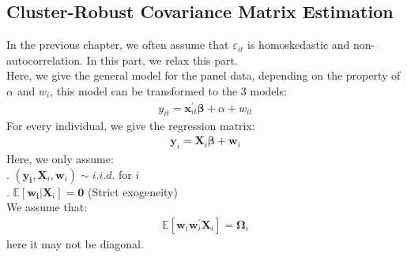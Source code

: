 \documentclass{article}
\begin{document}
\subsection{Cluster-Robust Covariance Matrix Estimation}
In the previous chapter, we often assume that $\varepsilon_{it}$ is homoskedastic and non-autocorrelation. In this part, we relax this part.\\
Here, we give the general model for the panel data, depending on the property of $\alpha$ and $w_i$, this model can be transformed to the 3 models:
	\begin{align*}
		y_{it} = \boldsymbol{x}^\prime_{it} \boldsymbol{\beta} + \alpha + w_{it}
	\end{align*}
For every individual, we give the regression matrix:
	\begin{align*}
		\boldsymbol{y}_i = \boldsymbol{X}_i \boldsymbol{\beta} + \boldsymbol{w}_i
	\end{align*}
Here, we only assume:\\
. $(\boldsymbol{y_i}, \boldsymbol{X}_i, \boldsymbol{w}_i) \sim i.i.d.$ for $i$\\
. $\mathbb{E} [\boldsymbol{w_i} | \boldsymbol{X}_i] = \boldsymbol{0}$ (Strict exogeneity)\\
We assume that:
	\begin{align*}
		\mathbb{E} [\boldsymbol{w}_i \boldsymbol{w}^\prime_i \boldsymbol{X}_i] = \boldsymbol{\Omega}_i
	\end{align*}
here it may not be diagonal.
\end{document}
